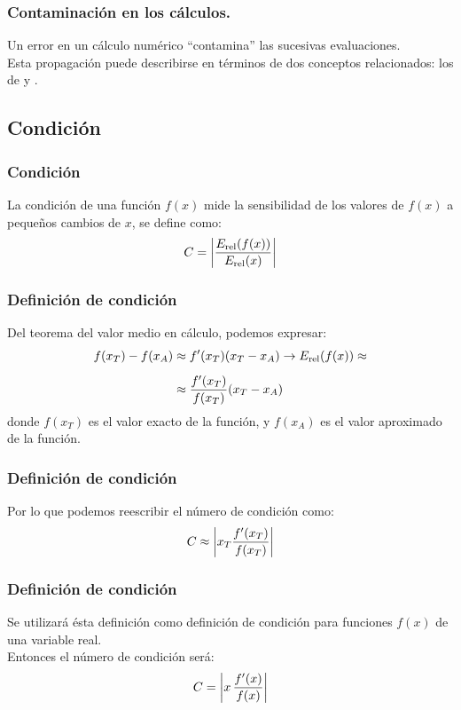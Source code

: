 \documentclass[12pt]{beamer}
\begin{document}
\begin{frame}
\frametitle{Contaminación en los cálculos.}
Un error en un cálculo numérico \enquote{contamina} las sucesivas evaluaciones.
\\
\bigskip
\pause
Esta propagación puede describirse en términos de dos conceptos relacionados: los de  y .
\end{frame}

\subsection{Condición}

\begin{frame}
\frametitle{Condición}
La condición de una función $f (x)$ mide la sensibilidad de los valores de $f (x)$ a pequeños cambios de $x$, se define como:
\pause
\begin{align*}
C = \abs{ \dfrac{E_{\text{rel}} (f (x))}{E_{\text{rel}} (x)} } 
\end{align*}
\end{frame}
\begin{frame}
\frametitle{Definición de condición}
Del teorema del valor medio en cálculo, podemos expresar:
\pause
\begin{align*}
f (x_{T}) - f (x_{A}) & \approx {f}^{\prime} (x_{T})(x_{T} - x_{A}) \rightarrow E_{\text{rel}}(f (x)) \approx \\[0.5em] 
 & \approx \dfrac{ {f}^{\prime} (x_{T})}{f (x_{T})} (x_{T} - x_{A})
\end{align*}
donde $f (x_{T})$ es el valor exacto de la función, y $f (x_{A})$ es el valor aproximado de la función.
\end{frame}
\begin{frame}
\frametitle{Definición de condición}
Por lo que podemos reescribir el número de condición como:
\pause
\begin{align*}
C \approx \abs{ x_{T} \dfrac{{f}^{\prime} (x_{T})}{f (x_{T})} }
\end{align*}
\end{frame}
\begin{frame}
\frametitle{Definición de condición}
Se utilizará ésta definición como definición de condición para funciones $f (x)$ de una variable real.
\\
\bigskip
Entonces el número de condición será:
\pause
\begin{align*}
C = \abs{ x \, \dfrac{{f}^{\prime} (x)}{f(x)} }
\end{align*}
\end{frame}
\end{document}
